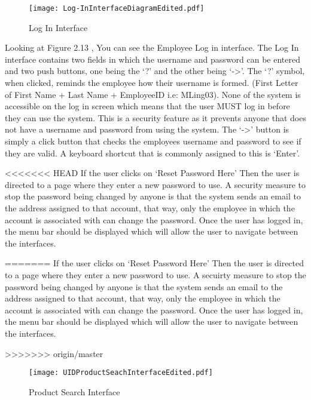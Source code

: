 \begin{figure}[H]
\caption{Log In Interface} \label{fig: Log In Interface}
\hfill\texttt{[image: Log-InInterfaceDiagramEdited.pdf]}\hspace*{\fill}
\end{figure}


\begin{flushleft}
Looking at Figure 2.13 , You can see the Employee Log in interface. The Log In interface contains two fields in which the username and password can be entered and two push buttons, one being the `?' and the other being `->'. The `?' symbol, when clicked, reminds the employee how their username is formed. (First Letter of First Name + Last Name + EmployeeID i.e: MLing03). None of the system is accessible on the log in screen which means that the user MUST log in before they can use the system. This is a security feature as it prevents anyone that does not have a username and password from using the system. The `->' button is simply a click button that checks the employees username and password to see if they are valid. A keyboard shortcut that is commonly assigned to this is `Enter'. \par

<<<<<<< HEAD
If the user clicks on `Reset Password Here' Then the user is directed to a page where they enter a new password to use. A security measure to stop the password being changed by anyone is that the system sends an email to the address assigned to that account, that way, only the employee in which the account is associated with can change the password.  Once the user has logged in, the menu bar should be displayed which will allow the user to navigate between the interfaces.\par
=======
If the user clicks on `Reset Password Here' Then the user is directed to a page where they enter a new password to use. A secuirty measure to stop the password being changed by anyone is that the system sends an email to the address assigned to that account, that way, only the employee in which the account is associated with can change the password.  Once the user has logged in, the menu bar should be displayed which will allow the user to navigate between the interfaces.\par
>>>>>>> origin/master

\end{flushleft}

\begin{figure}[H]
\caption{Product Search Interface} \label{fig: Product Search Interface}
\hfill\texttt{[image: UIDProductSeachInterfaceEdited.pdf]}\hspace*{\fill}
\end{figure}

